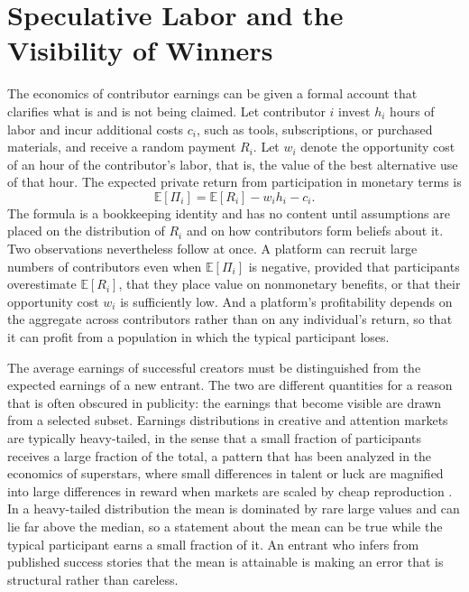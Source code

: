 \documentclass[11pt]{article}
\theoremstyle{remark}
\begin{document}
\section{Speculative Labor and the Visibility of Winners}\label{sec:speculative}

The economics of contributor earnings can be given a formal account that clarifies what is and is not being claimed. Let contributor $i$ invest $h_i$ hours of labor and incur additional costs $c_i$, such as tools, subscriptions, or purchased materials, and receive a random payment $R_i$. Let $w_i$ denote the opportunity cost of an hour of the contributor's labor, that is, the value of the best alternative use of that hour. The expected private return from participation in monetary terms is
\begin{equation}
\mathbb{E}[\Pi_i] = \mathbb{E}[R_i] - w_i h_i - c_i .
\end{equation}
The formula is a bookkeeping identity and has no content until assumptions are placed on the distribution of $R_i$ and on how contributors form beliefs about it. Two observations nevertheless follow at once. A platform can recruit large numbers of contributors even when $\mathbb{E}[\Pi_i]$ is negative, provided that participants overestimate $\mathbb{E}[R_i]$, that they place value on nonmonetary benefits, or that their opportunity cost $w_i$ is sufficiently low. And a platform's profitability depends on the aggregate across contributors rather than on any individual's return, so that it can profit from a population in which the typical participant loses.

The average earnings of successful creators must be distinguished from the expected earnings of a new entrant. The two are different quantities for a reason that is often obscured in publicity: the earnings that become visible are drawn from a selected subset. Earnings distributions in creative and attention markets are typically heavy-tailed, in the sense that a small fraction of participants receives a large fraction of the total, a pattern that has been analyzed in the economics of superstars, where small differences in talent or luck are magnified into large differences in reward when markets are scaled by cheap reproduction \cite{rosen1981}. In a heavy-tailed distribution the mean is dominated by rare large values and can lie far above the median, so a statement about the mean can be true while the typical participant earns a small fraction of it. An entrant who infers from published success stories that the mean is attainable is making an error that is structural rather than careless.
\end{document}
